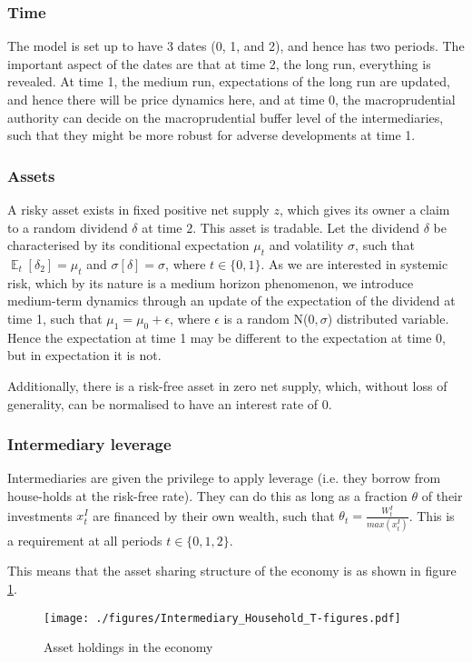 \documentclass[11pt]{article}
\DeclareMathOperator{\E}{\mathbb{E}} %
\begin{document}
\subsubsection*{Time}
The model is set up to have 3 dates (0, 1, and 2), and hence has two periods. The important aspect of the dates are that at time 2, the long run, everything is revealed. At time 1, the medium run, expectations of the long run are updated, and hence there will be price dynamics here, and at time 0, the macroprudential authority can decide on the macroprudential buffer level of the intermediaries, such that they might be more robust for adverse developments at time 1.


\subsubsection*{Assets}

A risky asset exists in fixed positive net supply $z$, which gives its owner a claim to a random dividend $\delta$ at time $2$. This asset is tradable. Let the dividend $\delta$ be characterised by its conditional expectation $\mu_t$ and volatility $\sigma$, such that $\E_t[\delta_2] = \mu_t$ and $\sigma[\delta] = \sigma$, where $t\in\{0,1\}$. As we are interested in systemic risk, which by its nature is a medium horizon phenomenon, we introduce medium-term dynamics through an update of the expectation of the dividend at time 1, such that $\mu_1 = \mu_0 + \epsilon$, where $\epsilon$ is a random N($0,\sigma$) distributed variable. Hence the expectation at time 1 may be different to the expectation at time 0, but in expectation it is not.

Additionally, there is a risk-free asset in zero net supply, which, without loss of generality, can be normalised to have an interest rate of 0.

\subsubsection*{Intermediary leverage}
Intermediaries are given the privilege to apply leverage (i.e. they borrow from house-holds at the risk-free rate). They can do this as long as a fraction $\theta$ of their investments $x^I_t$ are financed by their own wealth, such that $\theta_t = \frac{W^I_t}{max(x^{I}_t)}$. This is a requirement at all periods $t\in \{0,1,2\}$. 

This means that the asset sharing structure of the economy is as shown in figure \ref{fig:t-figure}.
\begin{figure}[h]
\centering
\texttt{[image: ./figures/Intermediary\_Household\_T-figures.pdf]}
\caption{Asset holdings in the economy\\
}
\label{fig:t-figure}
\end{figure}
\end{document}
